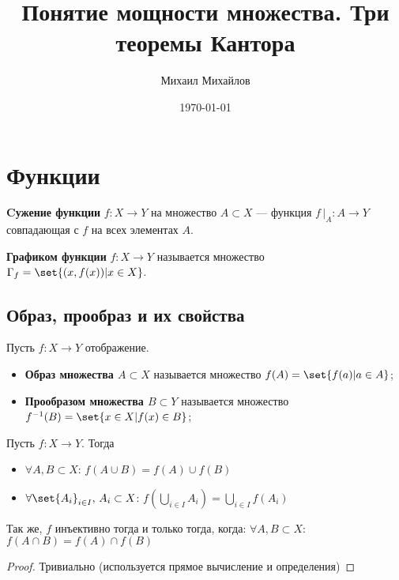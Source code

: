 \documentclass{article}
\title{Понятие мощности множества. Три теоремы Кантора}
\author{Михаил Михайлов}
\date{\today}
\begin{document}
\maketitle
\tableofcontents
\newpage

\section{Функции}

\begin{definition}
    \label{def:function-restriction}
    \textbf{Cужение функции} \(f: X \rightarrow Y\) на множество \(A \subset X\) --- функция \(f\,|_A: A \rightarrow Y\) совпадающая с \(f\) на всех элементах \(A\).  
\end{definition}

\begin{definition}
    \label{def:function-graphics}
    \textbf{Графиком функции} \(f: X \rightarrow Y\) называется множество \(\Gamma_f = \set{(x, f(x)) | x \in X}\).
\end{definition}


\subsection{Образ, прообраз и их свойства}
\begin{definition}
    \label{def:function-image-preimage}
    Пусть \(f: X \rightarrow Y\) отображение.
    \begin{itemize}
        \item \textbf{Образ множества \(A \subset X\)} называется множество \(f(A) = \set{f(a) | a \in A}\);
        \item \textbf{Прообразом множества \(B \subset Y\)} называется множество \(f^{-1}(B) = \set{x \in X | f(x) \in B}\);
    \end{itemize}
\end{definition}


\begin{proposition}
    Пусть \(f: X \rightarrow Y\). Тогда 
    \begin{itemize}
        \item \(\forall A, B \subset X\): \(f(A \cup B) = f(A) \cup f(B)\)
        \item \(\forall \set{A_i}_{i \in I},\, A_i \subset X\):  \(f(\bigcup_{i \in I} A_i) = \bigcup_{i \in I} f(A_i)\)
    \end{itemize}
    Так же, \(f\) инъективно тогда и только тогда, когда:  \(\forall A, B \subset X\): \(f(A \cap B) = f(A) \cap f(B)\)
\end{proposition}
\begin{proof}
    Тривиально (используется прямое вычисление и определения)
\end{proof}
\end{document}
